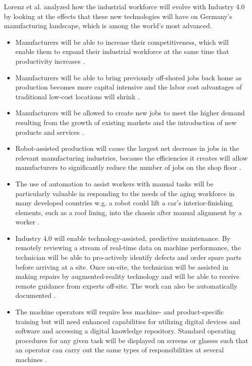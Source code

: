 Lorenz et al. \cite{MANMACHINE} analyzed how the industrial workforce will evolve with Industry 4.0 by looking at the effects that these new technologies will have on Germany’s manufacturing landscape, which is among the world’s most advanced. 
\begin{itemize}
\item Manufacturers will be able to increase their competitiveness, which will enable them to expand their industrial workforce at the same time that productivity increases \cite{MANMACHINE,IN4BCG}.
\item Manufacturers will be able to bring previously off-shored jobs back home as production becomes more capital intensive and the labor cost advantages of traditional low-cost locations will shrink \cite{MANMACHINE}.
\item Manufacturers will be allowed to create new jobs to meet the higher demand resulting from the growth of existing markets and the introduction of new products and services \cite{IN4BCG,INDUSINTERNET,MANMACHINE}.
\item Robot-assisted production will cause the largest net decrease in jobs in the relevant manufacturing industries, because the efficiencies it creates will allow manufacturers to significantly reduce the number of jobs on the shop floor \cite{MANMACHINE}.
\item The use of automation to assist workers with manual tasks will be particularly valuable in responding to the needs of the aging workforce in many developed countries w.g. a robot could lift a car’s interior-finishing elements, such as a roof lining, into the chassis after manual alignment by a worker \cite{MANMACHINE}.
\item Industry 4.0 will enable technology-assisted, predictive maintenance. By remotely reviewing a stream of real-time data on machine performance, the technician will be able to pro-actively identify defects and order spare parts before arriving at a site. Once on-site, the technician will be assisted in making repairs by augmented-reality technology and will be able to receive remote guidance from experts off-site. The work can also be automatically documented \cite{MANMACHINE}.
\item The machine operators will require less machine- and product-specific training but will need enhanced capabilities for utilizing digital devices and software and accessing a digital knowledge repository. Standard operating procedures for any given task will be displayed on screens or glasses such that an operator can carry out the same types of responsibilities at several machines \cite{MANMACHINE}.
\end{itemize}
